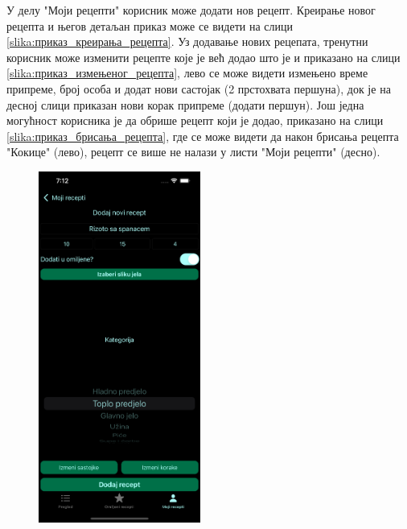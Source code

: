 \documentclass[12pt,oneside]{memoir}
\begin{document}
\indent У делу "Моји рецепти" корисник може додати нов рецепт. Креирање новог рецепта и његов детаљан приказ може се видети на слици \ref{slika:приказ_креирања_рецепта}. Уз додавање нових рецепата, тренутни корисник може изменити рецепте које је већ додао што је и приказано на слици \ref{slika:приказ_измењеног_рецепта}, лево се може видети измењено време припреме, број особа и додат нови састојак (2 прстохвата першуна), док је на десној слици приказан нови корак припреме (додати першун). Још једна могућност корисника је да обрише рецепт који је додао, приказано на слици \ref{slika:приказ_брисања_рецепта}, где се може видети да након брисања рецепта "Кокице" (лево), рецепт се више не налази у листи "Моји рецепти" (десно).

\begin{figure} [H]
    \centering
    \captionsetup{justification=centering}
    \includegraphics[width=0.475\textwidth]{images/simulators/testing images/create recipe.png}
    \hfill

\end{figure}
\end{document}
